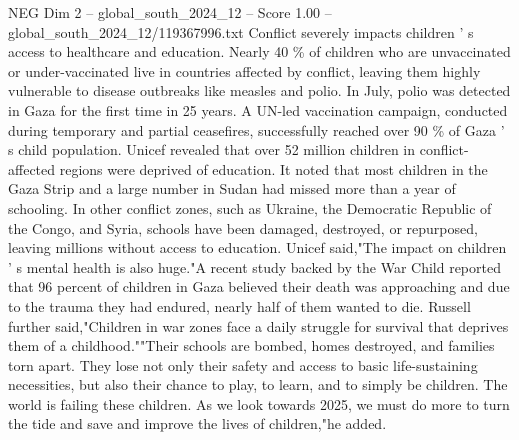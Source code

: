 \begin{textsample}{NEG Dim 2 – global\_south\_2024\_12 – Score 1.00 – global\_south\_2024\_12/119367996.txt}
Conflict severely impacts children ' s access to healthcare and education.
Nearly 40 \% of children who are unvaccinated or under-vaccinated live in countries affected by conflict, leaving them highly vulnerable to disease outbreaks like measles and polio.
In July, polio was detected in Gaza for the first time in 25 years.
A UN-led vaccination campaign, conducted during temporary and partial ceasefires, successfully reached over 90 \% of Gaza ' s child population.
Unicef revealed that over 52 million children in conflict-affected regions were deprived of education.
It noted that most children in the Gaza Strip and a large number in Sudan had missed more than a year of schooling.
In other conflict zones, such as Ukraine, the Democratic Republic of the Congo, and Syria, schools have been damaged, destroyed, or repurposed, leaving millions without access to education.
Unicef said,"The impact on children ' s mental health is also huge."A recent study backed by the War Child reported that 96 percent of children in Gaza believed their death was approaching and due to the trauma they had endured, nearly half of them wanted to die.
Russell further said,"Children in war zones face a daily struggle for survival that deprives them of a childhood.""Their schools are bombed, homes destroyed, and families torn apart.
They lose not only their safety and access to basic life-sustaining necessities, but also their chance to play, to learn, and to simply be children.
The world is failing these children.
As we look towards 2025, we must do more to turn the tide and save and improve the lives of children,"he added.

\end{textsample}
